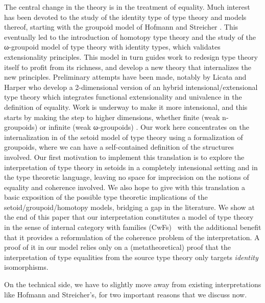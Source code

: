 The central change in the theory is in the treatment of equality.  Much
interest has been devoted to the study of the identity type of type
theory and models thereof, starting with the groupoid model of Hofmann
and Streicher \cite{groupoid-interp}. This eventually led to the
introduction of homotopy type theory and the study of the ω-groupoid
model of type theory with identity types, which validates extensionality
principles.
This model in turn
guides work to redesign type theory itself to profit from its
richness, and develop a new theory that internalizes the new
principles. Preliminary attempts have been made, notably by Licata and
Harper \cite{DBLP:conf/popl/LicataH12} who develop a 2-dimensional
version of an hybrid intensional/extensional type theory which
integrates functional extensionality and univalence in the definition
of equality. Work is underway to make it more intensional, and this
starts by making the step to higher dimensions, whether finite (weak
n-groupoids) or infinite (weak ω-groupoids)
\cite{DBLP:conf/csl/AltenkirchR12}. %
%
Our work here concentrates on the internalization in \Coq of the setoid
model of type theory using a formalization of groupoids, where we can have a
self-contained definition of the structures involved. 
%
Our first motivation to implement this translation is to explore the
interpretation of type theory in setoids in a completely intensional
setting and in the type theoretic language, leaving no space for
imprecision on the notions of equality and coherence involved.  We also
hope to give with this translation a basic exposition of the possible
type theoretic implications of the setoid/groupoid/homotopy models,
bridging a gap in the literature.
%
We show at the end of this paper that our interpretation constitutes a
model of type theory in the sense of internal category with families
(CwFs)~\cite{dybjer:internaltt} with the additional benefit that it
provides a reformulation of the coherence problem of the
interpretation. A proof of it in our model relies only on a
(metatheoretical) proof that the interpretation of type equalities from
the source type theory only targets \emph{identity} isomorphisms.

%
On the technical side, we have to slightly move away from existing
interpretations like Hofmann and Streicher's, for two important reasons
that we discuss now.


